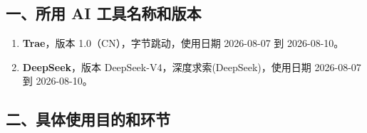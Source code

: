 
\subsection*{一、所用 AI 工具名称和版本}

\begin{enumerate}[leftmargin=*]
    \item[\textbf{[AI-1]}] \textbf{Trae}，版本 1.0（CN），字节跳动，使用日期 2026-08-07 到 2026-08-10。
    \item[\textbf{[AI-2]}] \textbf{DeepSeek}，版本 DeepSeek-V4，深度求索(DeepSeek)，使用日期 2026-08-07 到 2026-08-10。
\end{enumerate}

\subsection*{二、具体使用目的和环节}


